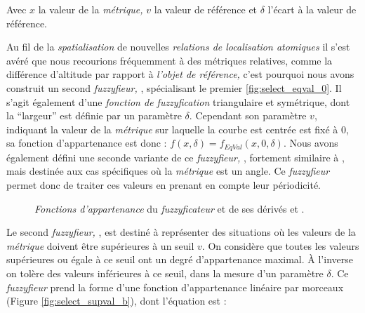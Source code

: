 Avec \(x\) la valeur de la \emph{métrique,} \(v\) la valeur de
référence et \(\delta\) l'écart à la valeur de référence.

Au fil de la \emph{spatialisation} de nouvelles \emph{relations de
  localisation atomiques} il s'est avéré que nous recourions
fréquemment à des métriques relatives, comme la différence d'altitude
par rapport à \emph{l'objet de référence,} c'est pourquoi nous avons
construit un second \emph{fuzzyfieur,} , spécialisant le
premier \autoref{fig:select_eqval_0}. Il s'agit également d'une
\emph{fonction de fuzzyfication} triangulaire et symétrique, dont la
\enquote{largeur} est définie par un paramètre \(\delta\). Cependant
son paramètre \(v\), indiquant la valeur de la \emph{métrique} sur
laquelle la courbe est centrée est fixé à 0, sa fonction
d'appartenance est donc : \(f(x,\delta) = f_{EqVal}(x,0,\delta)\). Nous avons
également défini une seconde variante de ce \emph{fuzzyfieur,}
, fortement similaire à , mais destinée
aux cas spécifiques où la \emph{métrique} est un angle. Ce
\emph{fuzzyfieur} permet donc de traiter ces valeurs en prenant en
compte leur périodicité.

\begin{figure}
  \centering
  \hfill  
  
  \caption{\emph{Fonctions d'appartenance} du \emph{fuzzyficateur}
    \protect{} et de ses dérivés \protect{}
    et \protect{}.}
  \label{fig:select_eqval}
\end{figure}

Le second \emph{fuzzyfieur,} , est destiné à
représenter des situations où les valeurs de la \emph{métrique}
doivent être supérieures à un seuil \(v\). On considère que toutes les
valeurs supérieures ou égale à ce seuil ont un degré d'appartenance
maximal. À l'inverse on tolère des valeurs inférieures à ce seuil,
dans la mesure d'un paramètre \(\delta\). Ce \emph{fuzzyfieur} prend
la forme d'une fonction d'appartenance linéaire par morceaux (Figure
\ref{fig:select_supval_b}), dont l'équation est :

